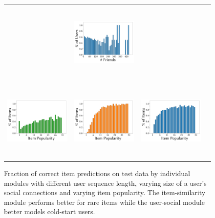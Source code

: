 \begin{figure}[tbh]
\begin{tabular}{c c c c}
  &
    \includegraphics[height=4cm,width=0.3\linewidth]{figures/epinions_temporal_Total_users_friend.pdf}\\
    \includegraphics[height=4cm,width=0.3\linewidth]{figures/epinions_itemSocial_Total_items_length.pdf}
 &
    \includegraphics[height=4cm,width=0.3\linewidth]{figures/epinions_userSocial_Total_items_length.pdf}
  &
    \includegraphics[height=4cm,width=0.3\linewidth]{figures/epinions_temporal_Total_items_length.pdf}\\
  \end{tabular}
  \caption{ Fraction of correct item predictions on test data by %
  individual modules with different user sequence length, varying size of a user's social connections and varying item popularity. The item-similarity module performs better for rare items while the user-social module better models cold-start users.}
  \label{fig:analysis}
\end{figure}


